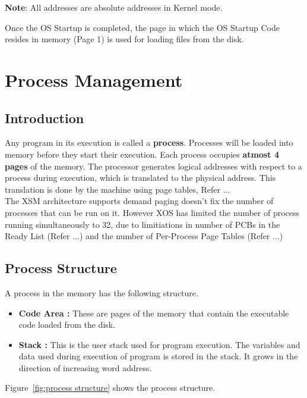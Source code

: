 \documentclass[11pt]{report}
\begin{document}
\textbf{Note}: All addresses are absolute addresses in Kernel mode. 

Once the OS Startup is completed, the page in which the OS Startup Code resides in memory (Page 1) is used for loading files from the disk.


\chapter{Process Management}
\label{chp:process}

\section{Introduction}
Any program in its execution is called a \textbf{process}. Processes will be loaded into memory before they start their execution. Each process occupies \textbf{atmost 4 pages} of the memory. The processor generates logical addresses with respect to a process during execution, which is translated to the physical address. This translation is done by the machine using page tables, Refer ... \\ 

The XSM architecture supports demand paging doesn't fix the number of processes that can be run on it. However XOS has limited the number of process running simultaneously to 32, due to limitiations in number of PCBs in the Ready List (Refer ...) and the number of Per-Process Page Tables (Refer ...)\\




\section{Process Structure}
A process in the memory has the following structure.
\begin{itemize}
	\item \textbf{Code Area :}  These are pages of the memory that contain the executable code loaded from the disk. 
	\item \textbf{Stack :} This is the user stack used for program execution. The variables and data used during execution of program is stored in the stack. It grows in the direction of increasing word address.
\end{itemize}

Figure~\ref{fig:process structure} shows the process structure. \\
\end{document}
